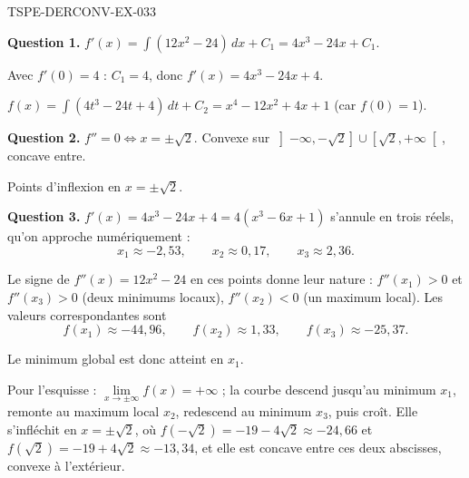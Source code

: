 \begin{corrige}{TSPE-DERCONV-EX-033}

\textbf{Question 1.} $f'(x) = \int (12x^2 - 24)\,dx + C_1 = 4x^3 - 24x + C_1$.

Avec $f'(0) = 4$ : $C_1 = 4$, donc $f'(x) = 4x^3 - 24x + 4$.


$f(x) = \int (4t^3 - 24t + 4)\,dt + C_2 = x^4 - 12x^2 + 4x + 1$ (car $f(0) = 1$).

\textbf{Question 2.} $f'' = 0 \iff x = \pm\sqrt{2}$. Convexe sur $\left]-\infty,-\sqrt2\right] \cup \left[\sqrt2,+\infty\right[$, concave entre.

Points d'inflexion en $x = \pm\sqrt{2}$.

\textbf{Question 3.} $f'(x) = 4x^3 - 24x + 4 = 4(x^3 - 6x + 1)$ s'annule en trois
réels, qu'on approche numériquement :
\[ x_1 \approx -2{,}53, \qquad x_2 \approx 0{,}17, \qquad x_3 \approx 2{,}36. \]

Le signe de $f''(x) = 12x^2 - 24$ en ces points donne leur nature :
$f''(x_1) > 0$ et $f''(x_3) > 0$ (deux minimums locaux), $f''(x_2) < 0$ (un
maximum local). Les valeurs correspondantes sont
\[ f(x_1) \approx -44{,}96, \qquad f(x_2) \approx 1{,}33, \qquad f(x_3) \approx -25{,}37. \]

Le minimum global est donc atteint en $x_1$.

Pour l'esquisse : $\lim\limits_{x\to\pm\infty} f(x) = +\infty$ ; la courbe descend
jusqu'au minimum $x_1$, remonte au maximum local $x_2$, redescend au minimum
$x_3$, puis croît. Elle s'infléchit en $x=\pm\sqrt2$, où
$f(-\sqrt2) = -19-4\sqrt2 \approx -24{,}66$ et $f(\sqrt2) = -19+4\sqrt2 \approx -13{,}34$,
et elle est concave entre ces deux abscisses, convexe à l'extérieur.

\end{corrige}
